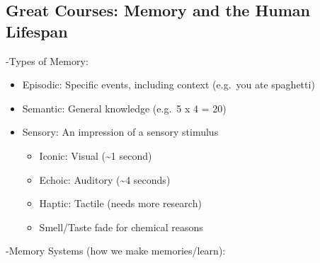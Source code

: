 \documentclass[
]{article}
\begin{document}
\hypertarget{great-courses-memory-and-the-human-lifespan}{%
\subsection{Great Courses: Memory and the Human
Lifespan}\label{great-courses-memory-and-the-human-lifespan}}

-Types of Memory:

\begin{itemize}
\item
  Episodic: Specific events, including context (e.g.~you ate spaghetti)
\item
  Semantic: General knowledge (e.g.~5 x 4 = 20)
\item
  Sensory: An impression of a sensory stimulus

  \begin{itemize}
  \item
    Iconic: Visual (\textasciitilde1 second)
  \item
    Echoic: Auditory (\textasciitilde4 seconds)
  \item
    Haptic: Tactile (needs more research)
  \item
    Smell/Taste fade for chemical reasons
  \end{itemize}
\end{itemize}

-Memory Systems (how we make memories/learn):
\end{document}
